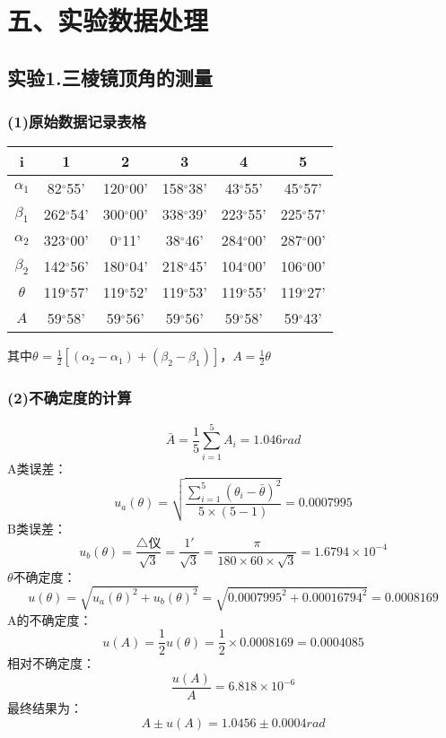 \documentclass[11pt,a4paper,oneside]{article}
\begin{document}
\section*{五、实验数据处理}
\subsection*{实验1.三棱镜顶角的测量}
\subsubsection*{(1)原始数据记录表格}

\begin{center}

\begin{tabular}{|c|c|c|c|c|c|}
\hline 
i & 1 & 2 & 3 & 4 & 5 \\ 
\hline 
${\alpha}_1$
&82$^{\circ}$55'&120$^{\circ}$00'&158$^{\circ}$38'&43$^{\circ}$55'&45$^{\circ}$57'
\\
\hline 
${\beta}_1$ 
&262$^{\circ}$54'&300$^{\circ}$00'&338$^{\circ}$39'&223$^{\circ}$55'&225$^{\circ}$57'
\\ 
\hline 
${\alpha}_2$
&323$^{\circ}$00'&0$^{\circ}$11'&38$^{\circ}$46'&284$^{\circ}$00'&287$^{\circ}$00'
\\ 
\hline 
${\beta}_2$ 
&142$^{\circ}$56'&180$^{\circ}$04'&218$^{\circ}$45'&104$^{\circ}$00'&106$^{\circ}$00'
\\ 
\hline 
${\theta}$ 
&119$^{\circ}$57'&119$^{\circ}$52'&119$^{\circ}$53'&119$^{\circ}$55'&119$^{\circ}$27'
\\ 
\hline 
$A$
&59$^{\circ}$58'&59$^{\circ}$56'&59$^{\circ}$56'&59$^{\circ}$58'&59$^{\circ}$43'
\\ 
\hline 
\end{tabular}
\vspace{10pt}

其中$\theta$ = $\displaystyle\frac{1}{2}[({\alpha}_2-{\alpha_1})+({\beta}_2-{\beta}_1)]$，$A=\displaystyle\frac{1}{2}{\theta}$

\end{center}

\subsubsection*{(2)不确定度的计算}

$$\bar{A} =\frac{1}{5}\sum\limits_{i=1}^{5}{A_i}=1.046rad$$
A类误差：$$u_a({\theta})=\sqrt{\displaystyle\frac{\sum\limits_{i=1}^{5} ({\theta}_i-\bar{\theta})^2}{5{\times}(5-1)}}=0.0007995 $$
B类误差：$$u_b({\theta})=\displaystyle\frac{\bigtriangleup\text{仪}}{\sqrt{3}}
= \frac{1'}{\sqrt{3}} = \frac{\pi}{180\times60\times\sqrt{3}} = 1.6794 \times 10^{-4} $$
${\theta}$不确定度：$$u({\theta})=\sqrt{{u_a({\theta})}^2+{u_b({\theta})}^2}=\sqrt{ 0.0007995^2 + 0.00016794^2} = 0.0008169 $$
A的不确定度：
$$u(A)=\displaystyle\frac{1}{2}u({\theta})=\displaystyle\frac{1}{2}{\times}0.0008169 = 0.0004085 $$
相对不确定度：$$\displaystyle\frac{u(A)}{A}=6.818{\times}10^{-6}$$
最终结果为：$$A{\pm}u(A) = 1.0456 {\pm} 0.0004rad$$
\end{document}
